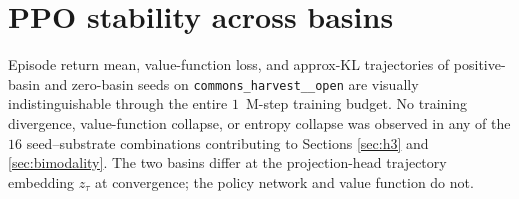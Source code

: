 \documentclass[11pt]{article}
\newcommand{\cH}{\texttt{commons\_harvest\_\_open}\xspace}
\begin{document}
\section{PPO stability across basins}
\label{app:ppo}

Episode return mean, value-function loss, and approx-KL trajectories of
positive-basin and zero-basin seeds on \cH are visually indistinguishable
through the entire $1$~M-step training budget. No training divergence,
value-function collapse, or entropy collapse was observed in any of the
$16$ seed--substrate combinations contributing to Sections \ref{sec:h3} and
\ref{sec:bimodality}. The two basins differ at the projection-head
trajectory embedding $z_\tau$ at convergence; the policy network and value
function do not.
\end{document}
